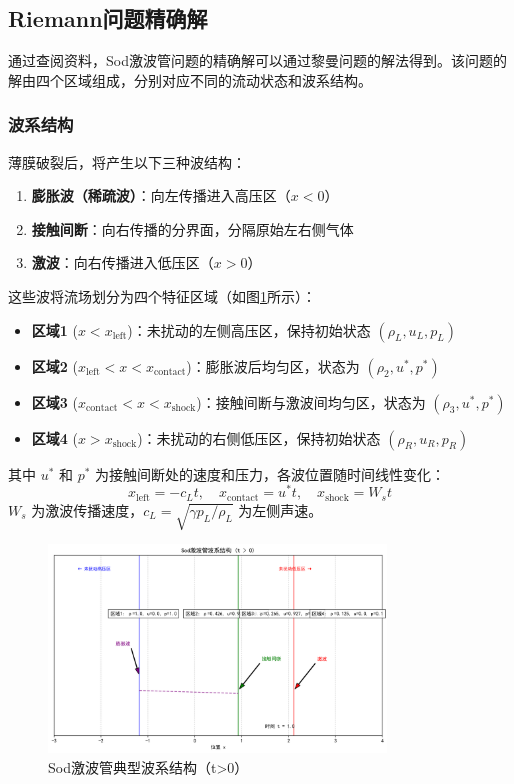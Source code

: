 \documentclass[UTF8]{ctexart}
\begin{document}
\subsection{Riemann问题精确解}
通过查阅资料，Sod激波管问题的精确解可以通过黎曼问题的解法得到。该问题的解由四个区域组成，分别对应不同的流动状态和波系结构。

\subsubsection{波系结构}
薄膜破裂后，将产生以下三种波结构：
\begin{enumerate}
    \item \textbf{膨胀波（稀疏波）}：向左传播进入高压区（$x<0$）
    \item \textbf{接触间断}：向右传播的分界面，分隔原始左右侧气体
    \item \textbf{激波}：向右传播进入低压区（$x>0$）
\end{enumerate}

这些波将流场划分为四个特征区域（如图\ref{fig:wave_structure}所示）：
\begin{itemize}
    \item \textbf{区域1} ($x < x_{\text{left}}$)：未扰动的左侧高压区，保持初始状态 $(\rho_L, u_L, p_L)$
    \item \textbf{区域2} ($x_{\text{left}} < x < x_{\text{contact}}$)：膨胀波后均匀区，状态为 $(\rho_2, u^*, p^*)$
    \item \textbf{区域3} ($x_{\text{contact}} < x < x_{\text{shock}}$)：接触间断与激波间均匀区，状态为 $(\rho_3, u^*, p^*)$
    \item \textbf{区域4} ($x > x_{\text{shock}}$)：未扰动的右侧低压区，保持初始状态 $(\rho_R, u_R, p_R)$
\end{itemize}

其中 $u^*$ 和 $p^*$ 为接触间断处的速度和压力，各波位置随时间线性变化：
$$x_{\text{left}} = -c_L t, \quad x_{\text{contact}} = u^* t, \quad x_{\text{shock}} = W_s t$$
$W_s$ 为激波传播速度，$c_L = \sqrt{\gamma p_L/\rho_L}$ 为左侧声速。

\begin{figure}[H]
    \centering
    \includegraphics[width=0.8\textwidth]{wave_structure.png}
    \caption{Sod激波管典型波系结构（t>0）}
    \label{fig:wave_structure}
\end{figure}
\end{document}
